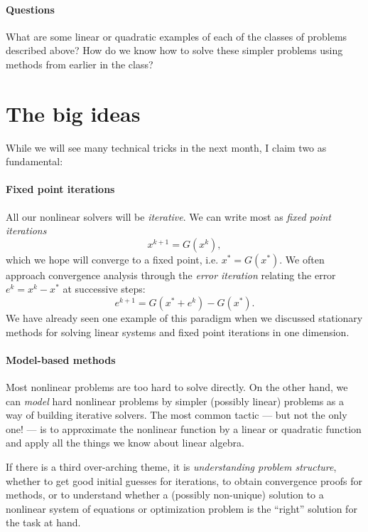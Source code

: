 \documentclass[12pt, leqno]{article} %
\begin{document}
\paragraph*{Questions}

What are some linear or quadratic examples of each of the classes of
problems described above?  How do we know how to solve these simpler
problems using methods from earlier in the class?

\section*{The big ideas}

While we will see many technical tricks in the next month, I claim
two as fundamental:

\paragraph{Fixed point iterations}
All our nonlinear solvers will be {\em iterative}.
We can write most as {\em fixed point iterations}
\begin{equation}
  x^{k+1} = G(x^k), \label{eq:fixed-point}
\end{equation}
which we hope will converge to a fixed point, i.e. $x^* = G(x^*)$.
We often approach convergence analysis through the
{\em error iteration} relating the error $e^k = x^k-x^*$ at
successive steps:
\begin{equation}
  e^{k+1} = G(x^* + e^k)-G(x^*).
\end{equation}
We have already seen one example of this paradigm when we discussed
stationary methods for solving linear systems and fixed point
iterations in one dimension.

\paragraph{Model-based methods}
Most nonlinear problems are too hard to solve directly.  On the other
hand, we can {\em model} hard nonlinear problems by simpler (possibly
linear) problems as a way of building iterative solvers.  The most
common tactic --- but not the only one! --- is to approximate the
nonlinear function by a linear or quadratic function and apply all the
things we know about linear algebra.

\vspace{5mm}
If there is a third over-arching theme, it is
{\em understanding problem structure}, whether to get good initial
guesses for iterations, to obtain convergence proofs for methods,
or to understand whether a (possibly non-unique) solution to a
nonlinear system of equations or optimization problem is the ``right''
solution for the task at hand.
\end{document}
